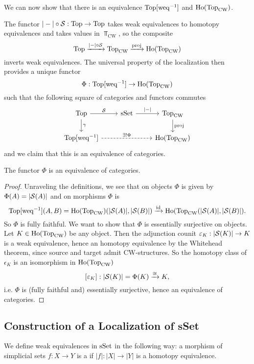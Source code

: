 

We can now show that there is an equivalence $\Top[\weq^\inv]$ and $\Ho(\Top_\text{CW})$.

The functor $|-|\circ\S:\Top\to\Top$ takes weak equivalences to homotopy equivalences and takes values in $\Top_\text{CW}$, so the composite
\[\Top\xto{|-|\circ\S}\Top_\text{CW}\xto{\text{proj}}\Ho(\Top_\text{CW})\]
inverts weak equivalences. The universal property of the localization then provides a unique functor
\[\Phi:\Top[\weq^\inv]\to\Ho(\Top_\text{CW})\]
such that the following square of categories and functors commutes
\[
\begin{tikzcd}
\Top \ar[d,"\gamma"] \ar[r,"\S"] & \sSet \ar[r,"{|-|}"] & \Top_\text{CW} \ar[d,"\text{proj}"]\\
\Top[\weq^\inv] \ar[rr,dashed,"\exists!\Phi"] & & \Ho(\Top_\text{CW})
\end{tikzcd}
\]
and we claim that this is an equivalence of categories.

\begin{theorem}
The functor $\Phi$ is an equivalence of categories.
\end{theorem}

\begin{proof}
Unraveling the definitions, we see that on objects $\Phi$ is given by $\Phi(A)=|\S(A)|$ and on morphisms $\Phi$ is
\[\Top[\weq^\inv](A,B)=\Ho(\Top_\text{CW})(|\S(A)|,|\S(B)|)\xto{\id}\Ho(\Top_\text{CW}(|\S(A)|,|\S(B)|).\]
So $\Phi$ is fully faithful. We want to show that $\Phi$ is essentially surjective on objects. Let $K\in\Ho(\Top_\text{CW})$ be any object. Then the adjunction counit $\epsilon_K:|\S(K)|\to K$ is a weak equivalence, hence an homotopy equivalence by the Whitehead theorem, since source and target admit CW-structures. So the homotopy class of $\epsilon_K$ is an isomorphism in $\Ho(\Top_\text{CW})$
\[[\epsilon_K]:|\S(K)|=\Phi(K)\xto{\cong}K,\]
i.e. $\Phi$ is (fully faithful and) essentially surjective, hence an equivalence of categories.
\end{proof}

\subsection{Construction of a Localization of sSet}

We define weak equivalences in $\sSet$ in the following way: a morphism  of simplicial sets $f:X\to Y$ is a  if $|f|:|X|\to|Y|$ is a homotopy equivalence.

